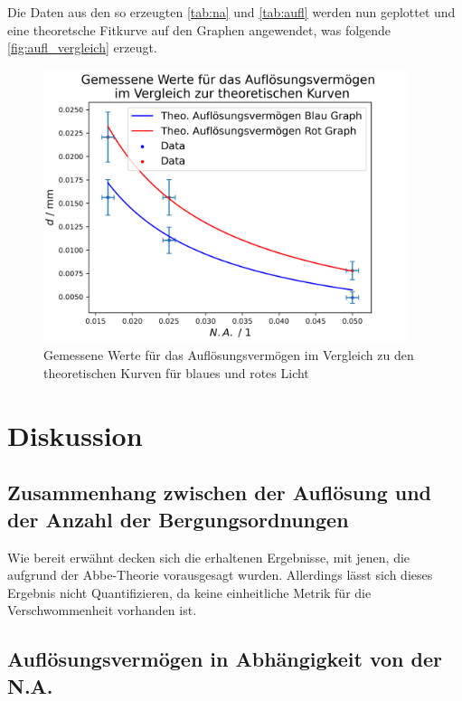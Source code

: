 \documentclass[11pt,ngerman]{scrartcl}
\begin{document}
Die Daten aus den so erzeugten \autoref{tab:na} und \autoref{tab:aufl} werden nun geplottet und eine theoretsche Fitkurve auf den Graphen angewendet, was folgende \autoref{fig:aufl_vergleich} erzeugt.

\begin{figure}
	\begin{center}
		\includegraphics[width=0.95\textwidth]{./pics/aufl.png}
	\end{center}
	\caption{Gemessene Werte für das Auflösungsvermögen im Vergleich zu den theoretischen Kurven für blaues und rotes Licht}
	\label{fig:aufl_vergleich}
\end{figure}


\newpage

\section{Diskussion}\label{disk}

\subsection{Zusammenhang zwischen der Auflösung und der Anzahl der Bergungsordnungen}

Wie bereit erwähnt decken sich die erhaltenen Ergebnisse, mit jenen, die aufgrund der Abbe-Theorie vorausgesagt wurden. Allerdings lässt sich dieses Ergebnis nicht Quantifizieren, da keine einheitliche Metrik für die Verschwommenheit vorhanden ist.

\vspace{2mm}

\subsection{Auflösungsvermögen in Abhängigkeit von der N.A.}
\end{document}
